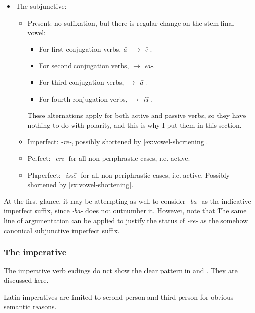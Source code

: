 \documentclass{article}
\newcommand*{\corpus}[1]{\emph{#1}}
\begin{document}
\begin{itemize}
\begin{itemize}
    \end{itemize}
    \item The subjunctive:
    \begin{itemize}
        \item Present: no suffixation, but there is regular change on the stem-final vowel:
        \begin{itemize}
            \item For first conjugation verbs, \corpus{\={a}-} $\to$ \corpus{\={e}-}.
            \item For second conjugation verbs, \corpus{} $\to$ \corpus{e\={a}-}.
            \item For third conjugation verbs, $\to$ \corpus{\={a}-}.
            \item For fourth conjugation verbs, $\to$ \corpus{i\={a}-}.
        \end{itemize}
        These alternations apply for both active and passive verbs,
        so they have nothing to do with polarity, and this is why I put them in this section.
        \item Imperfect: \corpus{-r\={e}-}, possibly shortened by \eqref{ex:vowel-shortening}.
        \item Perfect: \corpus{-eri-} for all non-periphrastic cases, i.e. active.
        \item Pluperfect: \corpus{-iss\={e}-} for all non-periphrastic cases, i.e. active.
        Possibly shortened by \eqref{ex:vowel-shortening}.
    \end{itemize}
\end{itemize}

At the first glance, it may be attempting as well to consider \corpus{-ba-} as 
the indicative imperfect suffix,
since \corpus{-b\={a}-} does not outnumber it.
However, note that 
The same line of argumentation can be applied to justify the status of \corpus{-r\={e}-}
as the somehow canonical subjunctive imperfect suffix.

\subsubsection{The imperative}\label{sec:imperative-morphology}

The imperative verb endings do not show the clear pattern 
in  and .
They are discussed here.

Latin imperatives are limited to second-person and third-person
for obvious semantic reasons.
\end{document}
